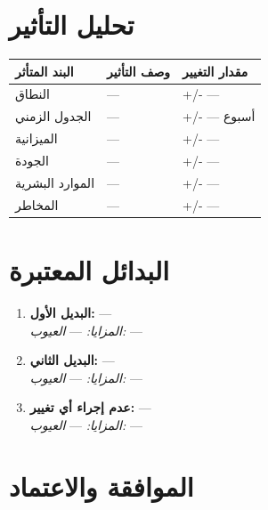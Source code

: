 \documentclass[11pt,a4paper]{article}
\begin{document}
\section{تحليل التأثير}
\label{sec:impact}

\begin{table}[H]
\centering
\renewcommand{\arraystretch}{1.5}
\begin{tabularx}{\textwidth}{L{4cm} X C{3cm}}
\toprule
\textbf{البند المتأثر} & \textbf{وصف التأثير} & \textbf{مقدار التغيير} \\
\midrule
النطاق & --- & +/- --- \\
الجدول الزمني & --- & +/- --- أسبوع \\
الميزانية & --- & +/- ---  \\
الجودة & --- & +/- --- \\
الموارد البشرية & --- & +/- --- \\
المخاطر & --- & +/- --- \\
\bottomrule
\end{tabularx}
\end{table}

\section{البدائل المعتبرة}
\label{sec:alternatives}

\begin{enumerate}
    \item \textbf{البديل الأول:} --- \\
    \textit{المزايا:} --- \quad \textit{العيوب:} ---
    \item \textbf{البديل الثاني:} --- \\
    \textit{المزايا:} --- \quad \textit{العيوب:} ---
    \item \textbf{عدم إجراء أي تغيير:} --- \\
    \textit{المزايا:} --- \quad \textit{العيوب:} ---
\end{enumerate}

\section{الموافقة والاعتماد}
\label{sec:approval}
\end{document}
